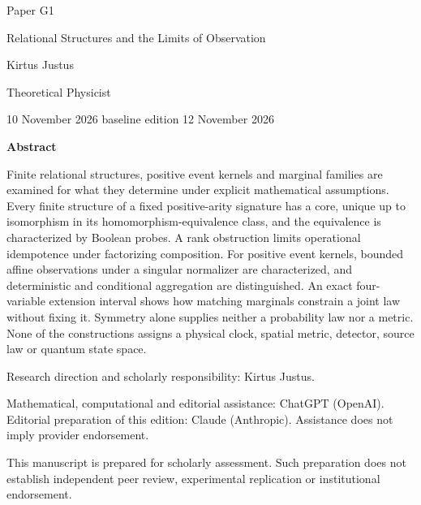 \documentclass[11pt,a4paper]{article}
\begin{document}
\begin{titlepage}
{\small\sffamily \ProgramTitle\hfill Paper G1\par}
\vspace*{16mm}
{\LARGE\bfseries\raggedright{} Relational Structures and the Limits of Observation\par}
\vspace{11mm}
{\large Kirtus Justus\par}
\vspace{1mm}
Theoretical Physicist\par
\AuthorLocation\par
\vspace{2mm}
10 November 2026 \textperiodcentered{} baseline edition 12 November 2026\par
\vspace{11mm}
\textbf{Abstract}\par
Finite relational structures, positive event kernels and marginal families are examined for what they determine under explicit mathematical assumptions. Every finite structure of a fixed positive-arity signature has a core, unique up to isomorphism in its homomorphism-equivalence class, and the equivalence is characterized by Boolean probes. A rank obstruction limits operational idempotence under factorizing composition. For positive event kernels, bounded affine observations under a singular normalizer are characterized, and deterministic and conditional aggregation are distinguished. An exact four-variable extension interval shows how matching marginals constrain a joint law without fixing it. Symmetry alone supplies neither a probability law nor a metric. None of the constructions assigns a physical clock, spatial metric, detector, source law or quantum state space.\par
\vfill
{\small Research direction and scholarly responsibility: Kirtus Justus.\par
Mathematical, computational and editorial assistance: ChatGPT (OpenAI). Editorial preparation of this edition: Claude (Anthropic).
Assistance does not imply provider endorsement.\par
This manuscript is prepared for scholarly assessment. Such preparation does not establish independent peer review,
experimental replication or institutional endorsement.\par}
\end{titlepage}
\setcounter{page}{2}
\setcounter{section}{0}

\clearpage
\end{document}
